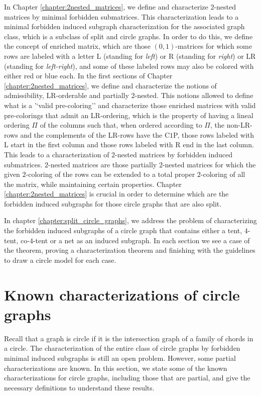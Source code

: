 \documentclass[12pt]{book}
\theoremstyle{plain}
\theoremstyle{remark}
\begin{document}
In Chapter \ref{chapter:2nested_matrices}, we define and characterize $2$-nested matrices by minimal forbidden submatrices. This characterization leads to a minimal forbidden induced subgraph characterization for the associated graph class, which is a subclass of split and circle graphs. 
In order to do this, we define the concept of enriched matrix, which are those $(0,1)$-matrices for which some rows are labeled with a letter L (standing for \textit{left}) or R (standing for \textit{right}) or LR (standing for \textit{left-right}), and some of these labeled rows may also be colored with either red or blue each. 
In the first sections of Chapter \ref{chapter:2nested_matrices}, we define and characterize the notions of admissibility, LR-orderable and partially $2$-nested. This notions allowed to define what is a '`valid pre-coloring'' and characterize those enriched matrices with valid pre-colorings that admit an LR-ordering, which is the property of having a lineal ordering $\Pi$ of the columns such that, when ordered according to $\Pi$, the non-LR-rows and the complements of the LR-rows have the C$1$P, those rows labeled with L start in the first column and those rows labeled with R end in the last column. %
This leads to a characterization of $2$-nested matrices by forbidden induced submatrices. $2$-nested matrices are those partially $2$-nested matrices for which the given $2$-coloring of the rows can be extended to a total proper $2$-coloring of all the matrix, while maintaining certain properties.
Chapter \ref{chapter:2nested_matrices} is crucial in order to determine which are the forbidden induced subgraphs for those circle graphs that are also split.

In chapter \ref{chapter:split_circle_graphs}, we address the problem of characterizing the forbidden induced subgraphs of a circle graph that contains either a tent, $4$-tent, co-$4$-tent or a net as an induced subgraph. In each section we see a case of the theorem, proving a characterization theorem and finishing with the guidelines to draw a circle model for each case.


\section{Known characterizations of circle graphs} \label{sec:circle1}


Recall that a graph is circle if it is the intersection graph of a family of chords in a circle. 
The characterization of the entire class of circle graphs by forbidden minimal induced subgraphs is still an open problem. However, some partial characterizations are known. In this section, we state some of the known characterizations for circle graphs, including those that are partial, and give the necessary definitions to understand these results. 
\end{document}
